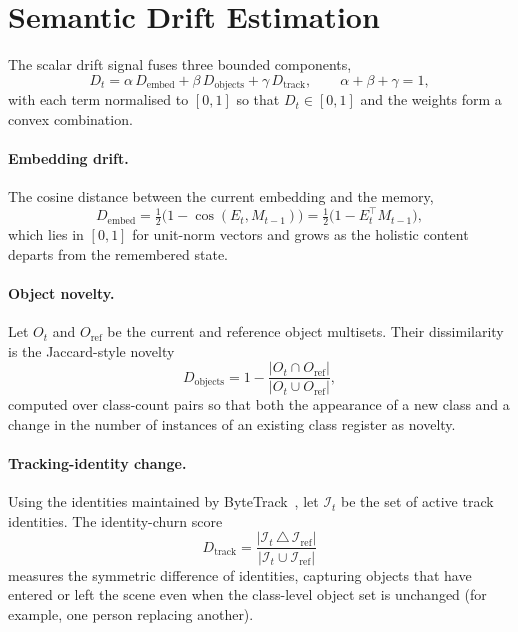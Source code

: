 \section{Semantic Drift Estimation}
\label{sec:meth-drift}

The scalar drift signal fuses three bounded components,
\begin{equation}
  D_t = \alpha\, D_{\text{embed}} + \beta\, D_{\text{objects}}
        + \gamma\, D_{\text{track}},
  \qquad \alpha + \beta + \gamma = 1,
  \label{eq:drift}
\end{equation}
with each term normalised to $[0,1]$ so that $D_t \in [0,1]$ and the weights
form a convex combination.

\paragraph{Embedding drift.} The cosine distance between the current
embedding and the memory,
\begin{equation}
  D_{\text{embed}} = \tfrac{1}{2}\bigl(1 - \cos(E_t, M_{t-1})\bigr)
  = \tfrac{1}{2}\bigl(1 - E_t^{\!\top} M_{t-1}\bigr),
  \label{eq:dembed}
\end{equation}
which lies in $[0,1]$ for unit-norm vectors and grows as the holistic content
departs from the remembered state.

\paragraph{Object novelty.} Let $O_t$ and $O_{\text{ref}}$ be the current and
reference object multisets. Their dissimilarity is the Jaccard-style novelty
\begin{equation}
  D_{\text{objects}} = 1 - \frac{\lvert O_t \cap O_{\text{ref}} \rvert}
                                 {\lvert O_t \cup O_{\text{ref}} \rvert},
  \label{eq:dobjects}
\end{equation}
computed over class-count pairs so that both the appearance of a new class and
a change in the number of instances of an existing class register as novelty.

\paragraph{Tracking-identity change.} Using the identities maintained by
ByteTrack~\cite{Zhang2022ByteTrack}, let $\mathcal{I}_t$ be the set of active
track identities. The identity-churn score
\begin{equation}
  D_{\text{track}} = \frac{\lvert \mathcal{I}_t \,\triangle\, \mathcal{I}_{\text{ref}} \rvert}
                          {\lvert \mathcal{I}_t \cup \mathcal{I}_{\text{ref}} \rvert}
  \label{eq:dtrack}
\end{equation}
measures the symmetric difference of identities, capturing objects that have
entered or left the scene even when the class-level object set is unchanged
(for example, one person replacing another).

